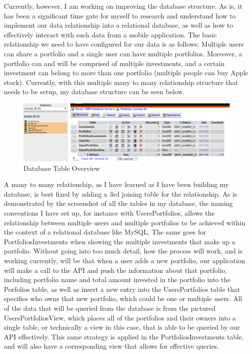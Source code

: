 \documentclass[letterpaper,10pt,titlepage,journal,compsoc,draftclsnofoot,onecolumn]{IEEEtran}
\begin{document}
Currently, however, I am working on improving the database structure. As is, it has been a significant time gate for myself to research and understand how to implement our data relationship into a relational database, as well as how to effectively interact with such data from a mobile application. The basic relationship we need to have configured for our data is as follows: Multiple users can share a portfolio and a single user can have multiple portfolios. Moreover, a portfolio can and will be comprised of multiple investments, and a certain investment can belong to more than one portfolio (multiple people can buy Apple stock). Currently, with this multiple many to many relationship structure that needs to be setup, my database structure can be seen below.

\begin{figure}[h]
\caption{Database Table Overview}
\centering
\includegraphics[width=\textwidth]{database_screenshot}
\end{figure}
A many to many relationship, as I have learned as I have been building my database, is best fixed by adding a 3rd joining table for the relationship. As is demonstrated by the screenshot of all the tables in my database, the naming conventions I have set up, for instance with UsersPortfolios, allows the relationship between multiple users and multiple portfolios to be achieved within the context of a relational database like MySQL. The same goes for PortfoliosInvestments when showing the multiple investments that make up a portfolio. Without going into too much detail, how the process will work, and is working currently, will be that when a user adds a new portfolio, our application will make a call to the API and push the information about that portfolio, including portfolio name and total amount invested in the portfolio into the Porfolios table, as well as insert a new entry into the UsersPortfolios table that specifies who owns that new portfolio, which could be one or multiple users. All of the data that will be queried from the database is from the pictured UsersPortfoliosView, which places all of the portfolios and their owners into a single table, or technically a view in this case, that is able to be queried by our API effectively. This same strategy is applied in the PortfoliosInvestments table, and will also have a corresponding view that allows for effective queries.
\end{document}
